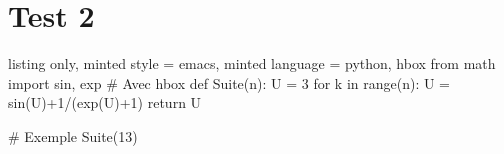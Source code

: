 \newpage

\section{Test 2}




\begin{tcblisting}{listing only, minted style = emacs, minted language = python, hbox}
from math import sin, exp
# Avec hbox 
def Suite(n):
    U = 3
    for k in range(n):
        U = sin(U)+1/(exp(U)+1)
    return U
 
# Exemple
Suite(13)
\end{tcblisting}



